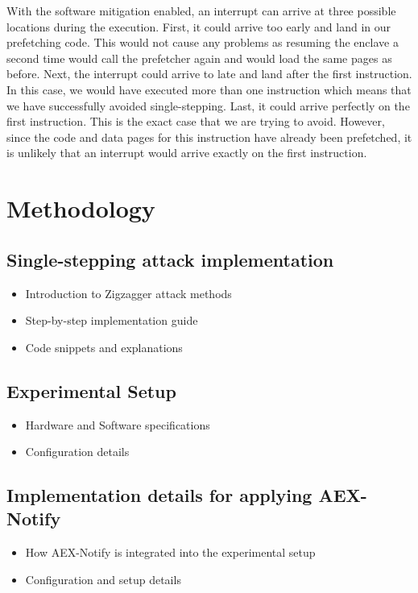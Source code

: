 \documentclass{llncs}
\begin{document}
With the software mitigation enabled, an interrupt can arrive at three possible
locations during the execution.
First, it could arrive too early and land in our prefetching code.
This would not cause any problems as resuming the enclave a second time would
call the prefetcher again and would load the same pages as before.
Next, the interrupt could arrive to late and land after the first instruction.
In this case, we would have executed more than one instruction which means
that we have successfully avoided single-stepping.
Last, it could arrive perfectly on the first instruction.
This is the exact case that we are trying to avoid.
However, since the code and data pages for this instruction have already been prefetched,
it is unlikely that an interrupt would arrive exactly on the first instruction.
  
\section{Methodology}

\subsection{Single-stepping attack implementation}
\begin{itemize}
  \item Introduction to Zigzagger attack methods
  \item Step-by-step implementation guide
  \item Code snippets and explanations
\end{itemize}

\subsection{Experimental Setup}
\begin{itemize}
  \item Hardware and Software specifications
  \item Configuration details
\end{itemize}

\subsection{Implementation details for applying AEX-Notify}
\begin{itemize}
  \item How AEX-Notify is integrated into the experimental setup
  \item Configuration and setup details
\end{itemize}
\end{document}
